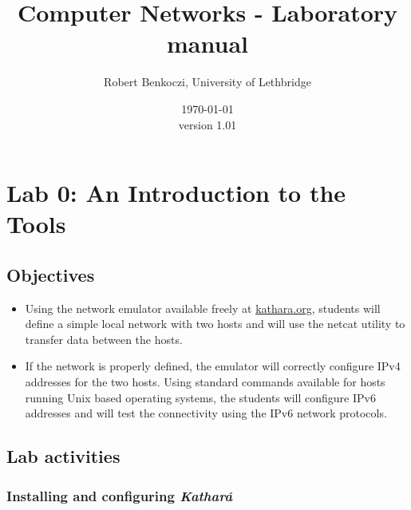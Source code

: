 \documentclass[12pt]{book}
\title{Computer Networks - Laboratory manual}    %
\author{Robert Benkoczi, University of Lethbridge}    %
\date{\today\\ version 1.01}  %
\newcommand{\kathara}{Kathar\'a}
\begin{document}
\frontmatter                            %
\maketitle    
\doclicenseThis                      
\tableofcontents                        %

\mainmatter %

\chapter{Lab 0: An Introduction to the Tools }\label{intro.se}

\section{Objectives}

\begin{itemize}[--]
\item Using the network emulator available freely at
  \url{kathara.org}, students will define a simple local network with
  two hosts and
  will use the netcat utility to transfer data between the hosts.

\item If the network is properly defined, the emulator will correctly
  configure IPv4 addresses for the two hosts. Using standard commands
  available for hosts running Unix based operating systems, the
  students will configure IPv6 addresses and will test the
  connectivity using the IPv6 network protocols.

\end{itemize}


\section{Lab activities}
\subsection{Installing and configuring \emph{\kathara}}
\end{document}
